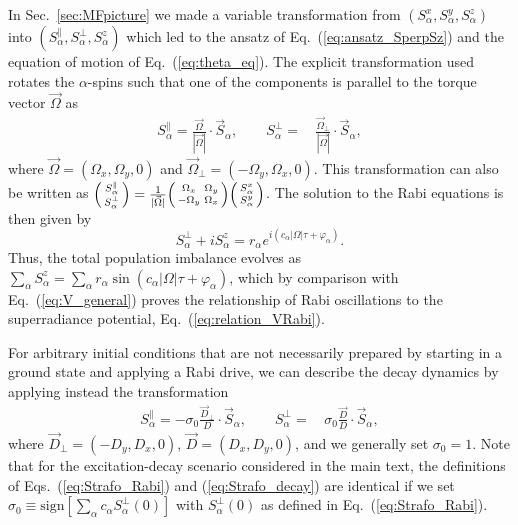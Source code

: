 \documentclass[aps,prx,superscriptaddress,twocolumn,notitlepage,nofootinbib,longbibliography]{revtex4-2}
\begin{document}
In Sec.~\ref{sec:MFpicture} we made a variable transformation from $(S^x_\alpha,S^y_\alpha,S^z_\alpha)$ into $(S^\parallel_\alpha,S^\perp_\alpha,S^z_\alpha)$ which led to the ansatz of Eq.~(\ref{eq:ansatz_SperpSz}) and the equation of motion of Eq.~(\ref{eq:theta_eq}).
The explicit transformation used rotates the $\alpha$-spins such that one of the components is parallel to the torque vector $\vec{\Omega}$ as
\begin{align}
	S^\parallel_\alpha = \frac{\vec{\Omega}}{|\vec{\Omega}|} \cdot \vec{S}_\alpha,
	\qquad S^\perp_\alpha =&\, \frac{\vec{\Omega}_\perp}{|\vec{\Omega}|} \cdot \vec{S}_\alpha,
\label{eq:Strafo_Rabi}
\end{align}
where $\vec{\Omega} = ( \Omega_x, \Omega_y, 0 )$ and $\vec{\Omega}_\perp = ( -\Omega_y, \Omega_x, 0 )$.
This transformation can also be written as $\begin{psmallmatrix} S^\parallel_\alpha \\ S^\perp_\alpha \end{psmallmatrix} = \frac{1}{|\vec{\Omega}|} \begin{psmallmatrix} \Omega_x & \Omega_y \\ -\Omega_y & \Omega_x \end{psmallmatrix}  \begin{psmallmatrix} S^x_\alpha \\ S^y_\alpha \end{psmallmatrix}$.
The solution to the Rabi equations is then given by
\begin{equation}
	S^\perp_\alpha + i S^z_\alpha = r_\alpha e^{i(c_\alpha |\Omega| \tau + \varphi_\alpha )}.
\label{eq:Rabi_solution_general}
\end{equation}
Thus, the total population imbalance evolves as $\sum_\alpha S^z_\alpha = \sum_\alpha r_\alpha \sin(c_\alpha |\Omega|\tau + \varphi_\alpha)$, which by comparison with Eq.~(\ref{eq:V_general}) proves the relationship of Rabi oscillations to the superradiance potential, Eq.~(\ref{eq:relation_VRabi}).

For arbitrary initial conditions that are not necessarily prepared by starting in a ground state and applying a Rabi drive, we can describe the decay dynamics by applying instead the transformation
\begin{align}
	S^\parallel_\alpha = - \sigma_0 \frac{\vec{D}_\perp}{D} \cdot \vec{S}_\alpha,
	\qquad S^\perp_\alpha =&\, \sigma_0 \frac{\vec{D}}{D} \cdot \vec{S}_\alpha,
\label{eq:Strafo_decay}
\end{align}
where $\vec{D}_\perp=(-D_y,D_x,0)$, $\vec{D}=(D_x,D_y,0)$, and we generally set $\sigma_0=1$. Note that for the excitation-decay scenario considered in the main text, the definitions of Eqs.~(\ref{eq:Strafo_Rabi}) and (\ref{eq:Strafo_decay}) are identical if we set $\sigma_0\equiv \text{sign}[ \sum_\alpha c_\alpha S^\perp_\alpha(0) ]$ with $S^\perp_\alpha(0)$ as defined in Eq.~(\ref{eq:Strafo_Rabi}).
\end{document}
